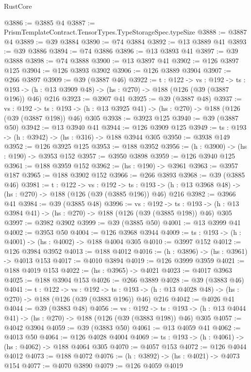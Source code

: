 \begin{lexlean}{RustCore}
\begin{coremodule}
@3886 := @3885 @4
@3887 := PrismTemplateContract.TensorTypes.TypeStorageSpec.typeSize
@3888 := @3887 @4
@3889 := @39 @3884
@3890 := @74 @3884
@3892 := @13 @3889 @41
@3893 := @39 @3886
@3894 := @74 @3886
@3896 := @13 @3893 @41
@3897 := @39 @3888
@3898 := @74 @3888
@3900 := @13 @3897 @41
@3902 := @126 @3897 @125
@3904 := @126 @3893 @3902
@3906 := @126 @3889 @3904
@3907 := @266 @3897
@3909 := @39 (@3887 @46)
@3922 := {t : @122} ->
  {vs : @192} ->
  {ts : @193} -> (h : @13 @3909 @48) -> (hs : @270) -> @188 (@126 (@39 (@3887 @196)) @46) @216
@3923 := @3907 @41
@3925 := @39 (@3887 @48)
@3937 := {vs : @192} ->
  {ts : @193} -> (h : @13 @3925 @41) -> (hs : @270) -> @188 (@126 (@39 (@3887 @198)) @46) @305
@3938 := @3923 @125
@3940 := @39 (@3887 @50)
@3942 := @13 @3940 @41
@3944 := @126 @3909 @125
@3949 := {ts : @193} -> (h : @3942) -> (hs : @316) -> @188 @3944 @305
@3950 := @3938 @149
@3952 := @126 @3925 @125
@3953 := @188 @3952
@3956 := (h : @3900) -> (hs : @190) -> @3953 @152
@3957 := @3950 @3898
@3959 := @126 @3940 @125
@3961 := @188 @3959 @152
@3962 := (hs : @190) -> @3961
@3963 := @3957 @187
@3965 := @188 @3902 @152
@3966 := @266 @3893
@3968 := @39 (@3885 @46)
@3981 := {t : @122} ->
  {vs : @192} ->
  {ts : @193} -> (h : @13 @3968 @48) -> (hs : @270) -> @188 (@126 (@39 (@3885 @196)) @46) @216
@3982 := @3966 @41
@3984 := @39 (@3885 @48)
@3996 := {vs : @192} ->
  {ts : @193} -> (h : @13 @3984 @41) -> (hs : @270) -> @188 (@126 (@39 (@3885 @198)) @46) @305
@3997 := @3982 @3902
@3999 := @39 (@3885 @50)
@4001 := @13 @3999 @41
@4002 := @3953 @50
@4004 := @126 @3968 @3944
@4009 := {ts : @193} -> (h : @4001) -> (hs : @4002) -> @188 @4004 @305
@4010 := @3997 @152
@4012 := @126 @3984 @3952
@4013 := @188 @4012
@4016 := (h : @3896) -> (hs : @3961) -> @4013 @153
@4017 := @4010 @3894
@4019 := @126 @3999 @3959
@4021 := @188 @4019 @153
@4022 := (hs : @3965) -> @4021
@4023 := @4017 @3963
@4025 := @188 @3904 @153
@4026 := @266 @3889
@4028 := @39 (@3883 @46)
@4041 := {t : @122} ->
  {vs : @192} ->
  {ts : @193} -> (h : @13 @4028 @48) -> (hs : @270) -> @188 (@126 (@39 (@3883 @196)) @46) @216
@4042 := @4026 @41
@4044 := @39 (@3883 @48)
@4056 := {vs : @192} ->
  {ts : @193} -> (h : @13 @4044 @41) -> (hs : @270) -> @188 (@126 (@39 (@3883 @198)) @46) @305
@4057 := @4042 @3904
@4059 := @39 (@3883 @50)
@4061 := @13 @4059 @41
@4062 := @4013 @50
@4064 := @126 @4028 @4004
@4069 := {ts : @193} -> (h : @4061) -> (hs : @4062) -> @188 @4064 @305
@4070 := @4057 @153
@4072 := @126 @4044 @4012
@4073 := @188 @4072
@4076 := (h : @3892) -> (hs : @4021) -> @4073 @154
@4077 := @4070 @3890
@4079 := @126 @4059 @4019

\end{coremodule}
\end{lexlean}
